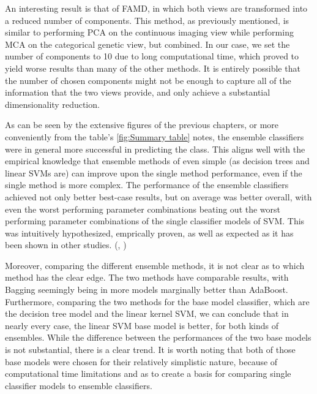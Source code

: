 {%
An interesting result is that of FAMD, in which both views are transformed into a reduced number of components. This method, as previously mentioned, is similar to performing PCA on the continuous imaging view while performing MCA on the categorical genetic view, but combined. In our case, we set the number of components to 10 due to long computational time, which proved to yield worse results than many of the other methods. It is entirely possible that the number of chosen components might not be enough to capture all of the information that the two views provide, and only achieve a substantial dimensionality reduction.

As can be seen by the extensive figures of the previous chapters, or more conveniently from the table's \ref{fig:Summary table} notes, the ensemble classifiers were in general more successful in predicting the class. This aligns well with the empirical knowledge that ensemble methods of even simple (as decision trees and linear SVMs are) can improve upon the single method performance, even if the single method is more complex. The performance of the ensemble classifiers achieved not only better best-case results, but on average was better overall, with even the worst performing parameter combinations beating out the worst performing parameter combinations of the single classifier models of SVM. This was intuitively hypothesized, emprically proven, as well as expected as it has been shown in other studies. (\cite{87}, \cite{88})

Moreover, comparing the different ensemble methods, it is not clear as to which method has the clear edge. The two methods have comparable results, with Bagging seemingly being in more models marginally better than AdaBoost. Furthermore, comparing the two methods for the base model classifier, which are the decision tree model and the linear kernel SVM, we can conclude that in nearly every case, the linear SVM base model is better, for both kinds of ensembles. While the difference between the performances of the two base models is not substantial, there is a clear trend. It is worth noting that both of those base models were chosen for their relatively simplistic nature, because of computational time limitations and as to create a basis for comparing single classifier models to ensemble classifiers.  

}
